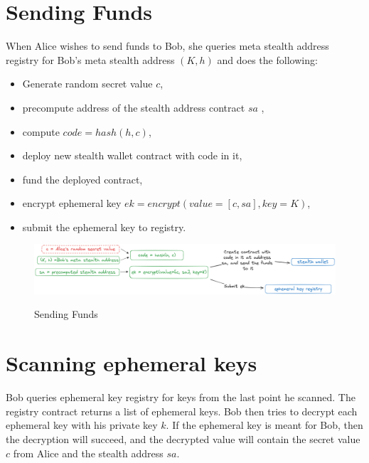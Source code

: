 \section{Sending Funds}

When Alice wishes to send funds to Bob, she queries meta stealth address registry
for Bob's meta stealth address $(K, h)$ and does the following:

\begin{itemize}
	\item Generate random secret value $c$,
    \item precompute address of the stealth address contract $sa$ \cite{stackexchangeAddressEthereum},
	\item compute $code = hash(h, c)$,
    \item deploy new stealth wallet contract with code in it,
    \item fund the deployed contract,
	\item encrypt ephemeral key $ek = encrypt(value=[c, sa], key=K)$,
    \item submit the ephemeral key to registry.
\end{itemize}

\begin{figure}[h]
    \centering
    \includegraphics[scale=0.18]{assets/images/sending-funds.png}
    \caption{Sending Funds}
    \label{fig:sending-funds}
	\cite{ButerinIncompleteGuide}
    \vspace{0.5cm}
\end{figure}

\section{Scanning ephemeral keys}

Bob queries ephemeral key registry for keys from the last point he scanned.
The registry contract returns a list of ephemeral keys. Bob then tries to decrypt
each ephemeral key with his private key $k$. If the ephemeral key is meant for
Bob, then the decryption will succeed, and the decrypted value will contain
the secret value $c$ from Alice and the stealth address $sa$.

